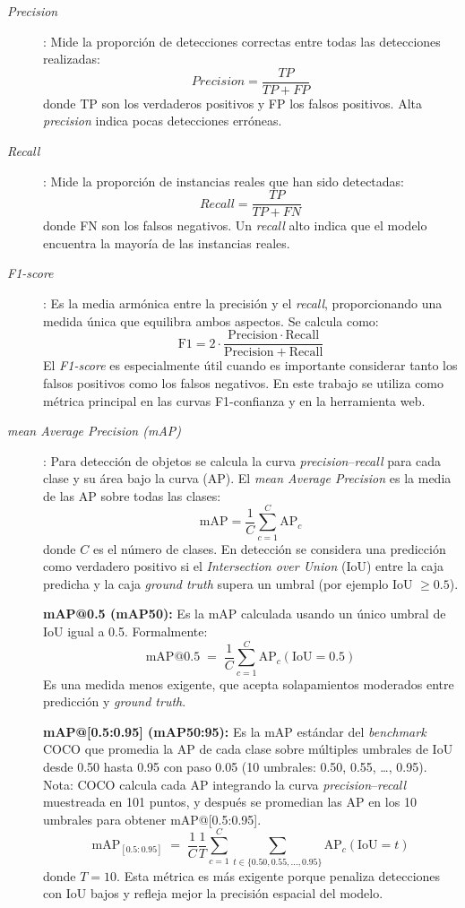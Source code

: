 \documentclass[12pt,a4paper,onecolumn,oneside]{report}
\begin{document}
\begin{description}
  \item[\textit{Precision}]: Mide la proporción de detecciones correctas entre todas las detecciones realizadas:
  \[
    \mathrm{\textit{Precision}} = \frac{TP}{TP + FP}
  \]
  donde TP son los verdaderos positivos y FP los falsos positivos. Alta \textit{precision} indica pocas detecciones erróneas.

  \item[\textit{Recall}]: Mide la proporción de instancias reales que han sido detectadas:
  \[
    \mathrm{\textit{Recall}} = \frac{TP}{TP + FN}
  \]
  donde FN son los falsos negativos. Un \textit{recall} alto indica que el modelo encuentra la mayoría de las instancias reales.

  \item[\textit{F1-score}]: Es la media armónica entre la precisión y el \textit{recall}, proporcionando una medida única que equilibra ambos aspectos. Se calcula como:
  \[
    \mathrm{F1} = 2 \cdot \frac{\mathrm{Precision} \cdot \mathrm{Recall}}{\mathrm{Precision} + \mathrm{Recall}}
  \]
  El \textit{F1-score} es especialmente útil cuando es importante considerar tanto los falsos positivos como los falsos negativos. En este trabajo se utiliza como métrica principal en las curvas F1-confianza y en la herramienta web.

  \item[\textit{mean Average Precision (mAP)}]: Para detección de objetos se calcula la curva \textit{precision}–\textit{recall} para cada clase y su área bajo la curva (AP). El \textit{mean Average Precision} es la media de las AP sobre todas las clases:
  \[
    \mathrm{mAP} = \frac{1}{C}\sum_{c=1}^{C} \mathrm{AP}_c
  \]
  donde $C$ es el número de clases. En detección se considera una predicción como verdadero positivo si el \textit{Intersection over Union} (IoU) entre la caja predicha y la caja \textit{ground truth} supera un umbral (por ejemplo IoU $\geq 0.5$). 

  \medskip

  \noindent\textbf{mAP@0.5 (mAP50):} Es la mAP calculada usando un único umbral de IoU igual a 0.5. Formalmente:
  \[
    \mathrm{mAP@0.5} \;=\; \frac{1}{C}\sum_{c=1}^{C} \mathrm{AP}_c(\mathrm{IoU}=0.5)
  \]
  Es una medida menos exigente, que acepta solapamientos moderados entre predicción y \textit{ground truth}.

  \medskip

  \noindent\textbf{mAP@[0.5:0.95] (mAP50:95):} Es la mAP estándar del \textit{benchmark} COCO que promedia la AP de cada clase sobre múltiples umbrales de IoU desde 0.50 hasta 0.95 con paso 0.05 (10 umbrales: 0.50, 0.55, …, 0.95). Nota: COCO calcula cada AP integrando la curva \textit{precision}–\textit{recall} muestreada en 101 puntos, y después se promedian las AP en los 10 umbrales para obtener mAP@[0.5:0.95].
  \[
    \mathrm{mAP}_{[0.5:0.95]} \;=\; \frac{1}{C}\frac{1}{T}\sum_{c=1}^{C}\sum_{t\in\{0.50,0.55,\dots,0.95\}} \mathrm{AP}_c(\mathrm{IoU}=t)
  \]
  donde $T=10$. Esta métrica es más exigente porque penaliza detecciones con IoU bajos y refleja mejor la precisión espacial del modelo.


\end{description}
\end{document}
